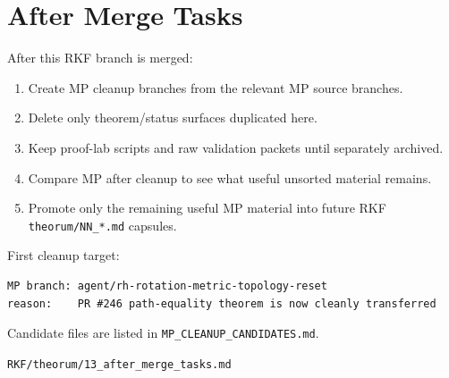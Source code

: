 \hypertarget{after-merge-tasks}{%
\chapter{After Merge Tasks}\label{after-merge-tasks}}

After this RKF branch is merged:

\begin{enumerate}
\def\labelenumi{\arabic{enumi}.}
\tightlist
\item
  Create MP cleanup branches from the relevant MP source branches.
\item
  Delete only theorem/status surfaces duplicated here.
\item
  Keep proof-lab scripts and raw validation packets until separately archived.
\item
  Compare MP after cleanup to see what useful unsorted material remains.
\item
  Promote only the remaining useful MP material into future RKF \texttt{theorum/NN\_*.md} capsules.
\end{enumerate}

First cleanup target:

\begin{verbatim}
MP branch: agent/rh-rotation-metric-topology-reset
reason:    PR #246 path-equality theorem is now cleanly transferred
\end{verbatim}

Candidate files are listed in \texttt{MP\_CLEANUP\_CANDIDATES.md}.

\begin{flushright}\small\texttt{RKF/theorum/13\_after\_merge\_tasks.md}\end{flushright}
